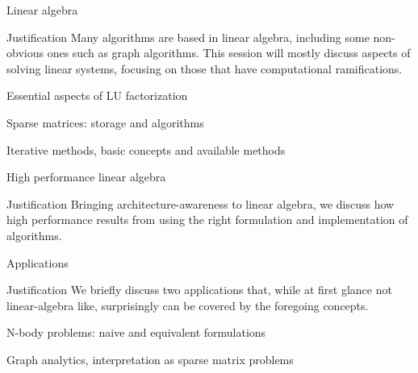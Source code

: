 \documentclass[11pt,headernav]{beamer}
\begin{document}
 {Linear algebra}

\begin{frame}{Justification}
  Many algorithms are based in linear algebra, 
  including some non-obvious ones such as graph algorithms.
  This session will mostly discuss aspects of 
  solving linear systems, focusing on those
  that have computational ramifications.
\end{frame}

\newenvironment{beamdisplayeq}%
 {\begin{equation}\small}{\end{equation}}

 {Essential aspects of LU factorization}



 {Sparse matrices: storage and algorithms}





 {Iterative methods, basic concepts and available methods}



 {High performance linear algebra}

\begin{frame}{Justification}
  Bringing architecture-awareness to linear algebra,
  we discuss how high performance results from
  using the right formulation and implementation of algorithms.
\end{frame}











 {Applications}

\begin{frame}{Justification}
  We briefly discuss two applications that,
  while at first glance not linear-algebra like, surprisingly 
  can be covered by the foregoing concepts.
\end{frame}

 {N-body problems: naive and equivalent formulations}
%


 {Graph analytics, interpretation as sparse matrix problems}
\end{document}

